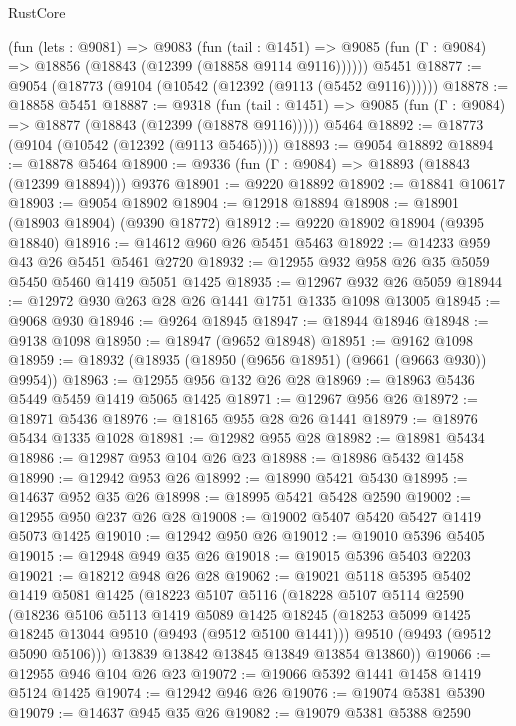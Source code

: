 \begin{lexlean}{RustCore}
\begin{coremodule}
    (fun (lets : @9081) =>
    @9083
      (fun (tail : @1451) =>
      @9085 (fun (Γ : @9084) => @18856 (@18843 (@12399 (@18858 @9114 @9116))))))
    @5451
@18877 := @9054 (@18773 (@9104 (@10542 (@12392 (@9113 (@5452 @9116))))))
@18878 := @18858 @5451
@18887 := @9318
    (fun (tail : @1451) => @9085 (fun (Γ : @9084) => @18877 (@18843 (@12399 (@18878 @9116)))))
    @5464
@18892 := @18773 (@9104 (@10542 (@12392 (@9113 @5465))))
@18893 := @9054 @18892
@18894 := @18878 @5464
@18900 := @9336 (fun (Γ : @9084) => @18893 (@18843 (@12399 @18894))) @9376
@18901 := @9220 @18892
@18902 := @18841 @10617
@18903 := @9054 @18902
@18904 := @12918 @18894
@18908 := @18901 (@18903 @18904) (@9390 @18772)
@18912 := @9220 @18902 @18904 (@9395 @18840)
@18916 := @14612 @960 @26 @5451 @5463
@18922 := @14233 @959 @43 @26 @5451 @5461 @2720
@18932 := @12955 @932 @958 @26 @35 @5059 @5450 @5460 @1419 @5051 @1425
@18935 := @12967 @932 @26 @5059
@18944 := @12972 @930 @263 @28 @26 @1441 @1751 @1335 @1098 @13005
@18945 := @9068 @930
@18946 := @9264 @18945
@18947 := @18944 @18946
@18948 := @9138 @1098
@18950 := @18947 (@9652 @18948)
@18951 := @9162 @1098
@18959 := @18932 (@18935 (@18950 (@9656 @18951) (@9661 (@9663 @930)) @9954))
@18963 := @12955 @956 @132 @26 @28
@18969 := @18963 @5436 @5449 @5459 @1419 @5065 @1425
@18971 := @12967 @956 @26
@18972 := @18971 @5436
@18976 := @18165 @955 @28 @26 @1441
@18979 := @18976 @5434 @1335 @1028
@18981 := @12982 @955 @28
@18982 := @18981 @5434
@18986 := @12987 @953 @104 @26 @23
@18988 := @18986 @5432 @1458
@18990 := @12942 @953 @26
@18992 := @18990 @5421 @5430
@18995 := @14637 @952 @35 @26
@18998 := @18995 @5421 @5428 @2590
@19002 := @12955 @950 @237 @26 @28
@19008 := @19002 @5407 @5420 @5427 @1419 @5073 @1425
@19010 := @12942 @950 @26
@19012 := @19010 @5396 @5405
@19015 := @12948 @949 @35 @26
@19018 := @19015 @5396 @5403 @2203
@19021 := @18212 @948 @26 @28
@19062 := @19021
    @5118
    @5395
    @5402
    @1419
    @5081
    @1425
    (@18223
      @5107
      @5116
      (@18228
        @5107
        @5114
        @2590
        (@18236
          @5106
          @5113
          @1419
          @5089
          @1425
          @18245
          (@18253 @5099 @1425 @18245 @13044 @9510 (@9493 (@9512 @5100 @1441)))
          @9510
          (@9493 (@9512 @5090 @5106)))
        @13839
        @13842
        @13845
        @13849
        @13854
        @13860))
@19066 := @12955 @946 @104 @26 @23
@19072 := @19066 @5392 @1441 @1458 @1419 @5124 @1425
@19074 := @12942 @946 @26
@19076 := @19074 @5381 @5390
@19079 := @14637 @945 @35 @26
@19082 := @19079 @5381 @5388 @2590

\end{coremodule}
\end{lexlean}
